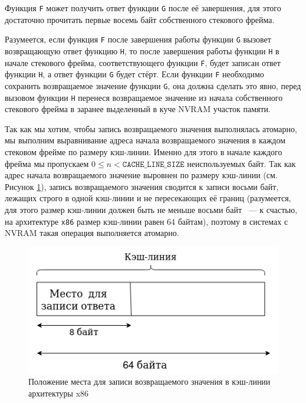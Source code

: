 \documentclass[times,specification,annotation]{itmo-student-thesis}
\begin{document}
Функция \texttt{F} может получить ответ функции \texttt{G} после её завершения, для этого достаточно прочитать первые восемь байт собственного стекового фрейма.

Разумеется, если функция \texttt{F} после завершения работы функции \texttt{G} вызовет возвращающую ответ функцию \texttt{H}, то после завершения работы функции \texttt{H} в начале стекового фрейма, соответствующего функции \texttt{F}, будет записан ответ функции \texttt{H}, а ответ функции \texttt{G} будет стёрт. Если функции \texttt{F} необходимо сохранить возвращаемое значение функции \texttt{G}, она должна сделать это явно, перед вызовом функции \texttt{H} перенеся возвращаемое значение из начала собственного стекового фрейма в заранее выделенный в куче NVRAM участок памяти.

Так как мы хотим, чтобы запись возвращаемого значения выполнялась атомарно, мы выполним выравнивание адреса начала возвращаемого значения в каждом стековом фрейме по размеру кэш-линии. Именно для этого в начале каждого фрейма мы пропускаем $0 \leq n <  \texttt{CACHE\_LINE\_SIZE}$ неиспользуемых байт. Так как адрес начала возвращаемого значение выровнен по размеру кэш-линии (см. Рисунок \ref{answer-aligmnent-pic}), запись возвращаемого значения сводится к записи восьми байт, лежащих строго в одной кэш-линии и не пересекающих её границ (разумеется, для этого размер кэш-линии должен быть не меньше восьми байт ~--- к счастью, на архитектуре \texttt{x86} размер кэш-линии равен 64 байтам), поэтому в системах с NVRAM такая операция выполняется атомарно.

\begin{figure}[H]
  \centering
  \caption{Положение места для записи возвращаемого значения в кэш-линии архитектуры x86}
  \label{answer-aligmnent-pic}
  \includegraphics[width=\linewidth]{answer_in_cacheline.png}
\end{figure}
\end{document}
